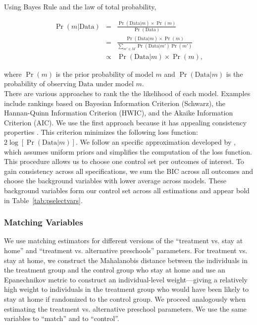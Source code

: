 \pagebreak
\noindent Using Bayes Rule and the law of total probability,

\begin{eqnarray}
\Pr( m | \text{Data} ) &=& \frac{\Pr(\text{Data} | m)\times \Pr(m)}{ \Pr(\text{Data})}\\ \nonumber
&=& \frac{\Pr(\text{Data} | m)\times \Pr(m)}{\sum \limits _{m' \in M} \Pr (\text{Data} | m') \Pr(m')} \\ \nonumber
&\propto& \Pr (\text{Data} | m) \times \Pr(m),
\end{eqnarray}

\noindent where $\Pr(m)$ is the prior probability of model $m$ and $\Pr(\text{Data} | m)$ is the probability of observing $\text{Data}$ under model $m$.\\

\noindent There are various approaches to rank the the likelihood of each model. Examples include rankings based on Bayesian Information Criterion (Schwarz), the Hannan-Quinn Information Criterion (HWIC), and the Akaike Information Criterion (AIC). We use the first approach because it has appealing consistency properties \citep{Diebold_2007_Forecasting}. This criterion minimizes the following loss function: $2 \log [\Pr( \text{Data} | m)]$. We follow an specific approximation developed by \citet{Claeskens-Hjort_2008_Model-Selection}, which assumes uniform priors and simplifies the computation of the loss function.\\

\noindent This procedure allows us to choose one control set per outcomes of interest. To gain consistency across all specifications, we sum the BIC across all outcomes and choose the background variables with lower average across models. These background variables form our control set across all estimations and appear bold in Table~\ref{tab:pselectvars}.\\

\subsubsection{Matching Variables}\label{app:matching-is-fun}

\noindent We use matching estimators for different versions of the ``treatment vs. stay at home'' and ``treatment vs. alternative preschools'' parameters. For treatment vs. stay at home, we construct the Mahalanobis distance between the individuals in the treatment group and the control group who stay at home and use an Epanechnikov metric to construct an individual-level weight---giving a relatively high weight to individuals in the treatment group who would have been likely to stay at home if randomized to the control group. We proceed analogously when estimating the treatment vs. alternative preschool parameters. We use the same variables to ``match'' and to ``control''.\\

